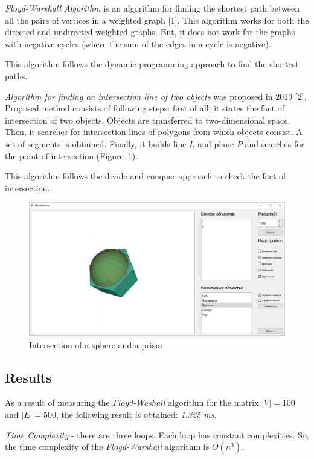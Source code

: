 \textit{Floyd-Warshall Algorithm} is an algorithm for finding the shortest path between all the pairs of vertices in a weighted graph [1].
This algorithm works for both the directed and undirected weighted graphs.
But, it does not work for the graphs with negative cycles (where the sum of the edges in a cycle is negative).

This algorithm follows the dynamic programming approach to find the shortest paths.

\textit{Algorithm for finding an intersection line of two objects} was proposed in 2019 [2].
Proposed method consists of following steps: first of all, it states the fact of intersection of two objects.
Objects are transferred to two-dimensional space.
Then, it searches for intersection lines of polygons from which objects consist.
A set of segments is obtained.
Finally, it builds line $L$ and plane $P$ and searches for the point of intersection (Figure~\ref{ris:soliddemo}).

This algorithm follows the divide and conquer approach to check the fact of intersection.

\begin{figure}[H]
    \center
    \includegraphics[width=\textwidth]{img/soliddemo.jpg}
    \caption{Intersection of a sphere and a prism}
    \label{ris:soliddemo}
\end{figure}

\subsection{Results}\label{subsec:results}

As a result of measuring the \textit{Floyd-Washall} algorithm for the matrix $\lvert V \rvert = 100$ and $\lvert E \rvert = 500$, the following result is obtained: \textit{1.325 ms}.

\textit{Time Complexity} - there are three loops.
Each loop has constant complexities.
So, the time complexity of the \textit{Floyd-Warshall} algorithm is $O(n^3)$.

